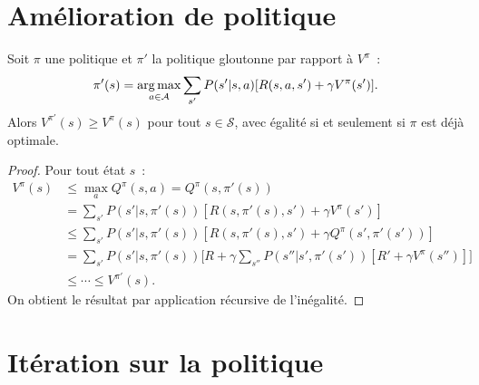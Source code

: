 \section{Am\'elioration de politique}

\begin{theoreme}
\label{thm:policy_improvement}
Soit $\pi$ une politique et $\pi'$ la politique gloutonne par rapport \`a $V^\pi$~:
\[
    \pi'(s) = \operatorname*{arg\,max}_{a \in \mathcal{A}} \sum_{s'} P(s'|s,a)[R(s,a,s') + \gamma V^\pi(s')].
\]
Alors $V^{\pi'}(s) \geq V^\pi(s)$ pour tout $s \in \mathcal{S}$, avec \'egalit\'e
si et seulement si $\pi$ est d\'ej\`a optimale.
\end{theoreme}

\begin{proof}
Pour tout \'etat $s$~:
\begin{align*}
    V^\pi(s) &\leq \max_a Q^\pi(s,a) = Q^\pi(s, \pi'(s)) \\
    &= \sum_{s'} P(s'|s,\pi'(s))[R(s,\pi'(s),s') + \gamma V^\pi(s')] \\
    &\leq \sum_{s'} P(s'|s,\pi'(s))[R(s,\pi'(s),s') + \gamma Q^\pi(s',\pi'(s'))] \\
    &= \sum_{s'} P(s'|s,\pi'(s))\Big[R + \gamma \sum_{s''} P(s''|s',\pi'(s'))
       [R' + \gamma V^\pi(s'')]\Big] \\
    &\leq \cdots \leq V^{\pi'}(s).
\end{align*}
On obtient le r\'esultat par application r\'ecursive de l'in\'egalit\'e.
\end{proof}

\section{It\'eration sur la politique}

